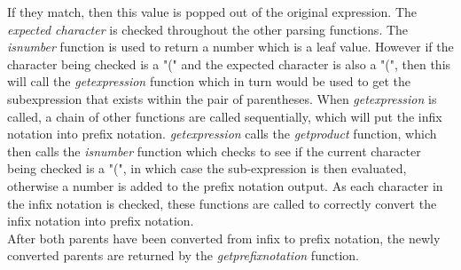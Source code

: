 \documentclass[11pt]{article}
\begin{document}
 If they match, then this value is popped out of the original expression. The \textit{expected character} is checked throughout the other parsing functions. The \textit{is\textunderscore number} function is used to return a number which is a leaf value. 
However if the character being checked is a "(" and the expected character is also a "(", then this will call the \textit{get\textunderscore expression} function which in turn would be used to get the subexpression that exists within the pair of parentheses. When  \textit{get\textunderscore expression} is called,  a chain of other functions are called sequentially, which will put the infix notation into prefix notation.
\textit{get\textunderscore expression} calls the \textit{get\textunderscore product} function, which then calls the \textit{is\textunderscore number} function which checks to see if the current character being checked is a "(", in which case the sub-expression is then evaluated, otherwise a number is added to the prefix notation output.  As each character in the infix notation is checked, these functions are called to correctly convert the infix notation into prefix notation. \\ 
After both parents have been converted from infix to prefix notation, the newly converted parents are returned by the \textit{get\textunderscore prefix\textunderscore notation} function.  
\end{document}
